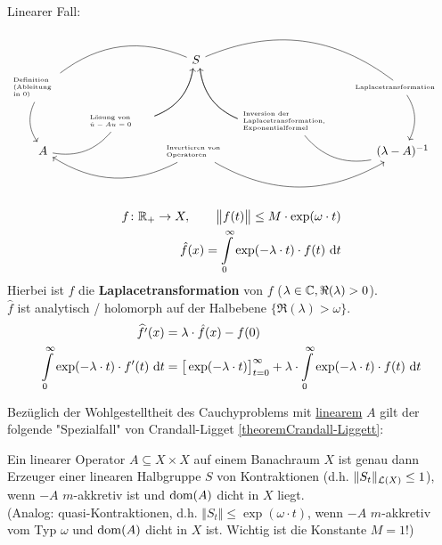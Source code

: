 Linearer Fall:
$$
\begin{tikzcd}[sep=tiny]
	& & S \arrow[drr, dash, bend left] \arrow[ddr, dash, bend right] \arrow[ddl, dash, bend left] \arrow[dll, dash, bend right]
	& & \\
	\parbox{50pt}{\tiny Definition\\(Ableitung\\in $0$)} 
	\arrow[dd, bend right]
	& & & 
	& \parbox{80pt}{\tiny Laplacetransformation}
	\arrow[dd, bend left]	\\
	&\parbox{50pt}{\tiny Lösung von \\$\dot{u}-Au=0$} 
	\arrow[uur, bend right]
	& 
	&\parbox{80pt}{\tiny Inversion der\\Laplacetransformation,\\Exponentialformel}
	\arrow[uul, bend left] 
	\\
	A \arrow[ur, dash, bend right] & & \arrow[ll, bend left] \parbox{50pt}{\tiny \tiny Invertieren von\\Operatoren} \arrow[rr, bend right]& & (\lambda - A)^{-1} \arrow[ul, dash, bend left]
\end{tikzcd}
$$

\begin{align*}
	f\colon\mathbb{R}_+\to X,\qquad\big\Vert f(t)\big\Vert\leq M\cdot\exp(\omega\cdot t)\\
	\hat{f}(x)=\int\limits_0^\infty\exp(-\lambda\cdot t)\cdot f(t)\text{ d} t
\end{align*}
Hierbei ist $\hat{f}$ die \textbf{Laplacetransformation} von $f$ ($\lambda\in\mathbb{C},\Re(\lambda)>0$).\\
$\hat{f}$ ist analytisch / holomorph auf der Halbebene $\big\lbrace\Re(\lambda)>\omega\big\rbrace$. 
\begin{align*}
	\widehat{f'}(x)&=\lambda\cdot\hat{f}(x)-f(0)\\
	\int\limits_0^\infty\exp(-\lambda\cdot t)\cdot f'(t)\text{ d} t
	&=\big[\exp(-\lambda\cdot t)\big]_{t=0}^\infty+\lambda\cdot\int\limits_0^\infty\exp(-\lambda\cdot t)\cdot f(t)\text{ d} t
\end{align*}

Bezüglich der Wohlgestelltheit des Cauchyproblems mit \ul{linearem} $A$ gilt der folgende "Spezialfall" von Crandall-Ligget \ref{theoremCrandall-Liggett}:

\begin{theorem}\enter
	Ein linearer Operator $A\subseteq X\times X$ auf einem Banachraum $X$ ist genau dann Erzeuger einer linearen Halbgruppe $S$ von Kontraktionen 
	(d.h. $\Vert S_t\Vert_{\mathcal{L}(X)}\leq 1$), wenn $-A$ $m$-akkretiv ist und $\operatorname{dom}(A)$ dicht in $X$ liegt.\\
	(Analog: quasi-Kontraktionen, d.h. $\Vert S_t\Vert\leq\exp(\omega\cdot t)$, wenn $-A$ $m$-akkretiv vom Typ $\omega$ und $\operatorname{dom}(A)$ dicht in $X$ ist.
	Wichtig ist die Konstante $M=1$!)
\end{theorem}

